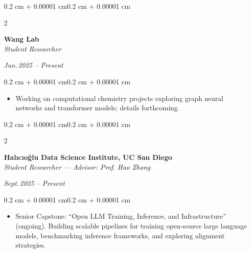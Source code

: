 \documentclass[10pt, letterpaper]{article}
\newenvironment{highlights}{
    \begin{itemize}[
        topsep=0.10 cm,
        parsep=0.10 cm,
        partopsep=0pt,
        itemsep=0pt,
        leftmargin=0.4 cm + 10pt
    ]
}{\end{itemize}}
\newenvironment{onecolentry}{
    \begin{adjustwidth}{0.2 cm + 0.00001 cm}{0.2 cm + 0.00001 cm}
}{\end{adjustwidth}}
\newenvironment{twocolentry}[2][]{
    \onecolentry
    \def\secondColumn{#2}
    \setcolumnwidth{\fill, 4.5 cm}
    \begin{paracol}{2}
}{
    \switchcolumn \raggedleft \secondColumn
    \end{paracol}
    \endonecolentry
}
\begin{document}
    \vspace{0.20 cm}

    \begin{twocolentry}{\textit{Jun.\,2025 -- Present}}
        \textbf{Wang Lab}\\
        \textit{Student Researcher}
    \end{twocolentry}

    \vspace{0.10 cm}
    \begin{onecolentry}
        \begin{highlights}
            \item Working on computational chemistry projects exploring graph neural networks and transformer models; details forthcoming.
        \end{highlights}
    \end{onecolentry}

    \vspace{0.20 cm}

    \begin{twocolentry}{\textit{Sept.\,2025 -- Present}}
        \textbf{Halıcıo\u{g}lu Data Science Institute, UC San Diego}\\
        \textit{Student Researcher — Advisor: Prof. Hao Zhang}
    \end{twocolentry}

    \vspace{0.10 cm}
    \begin{onecolentry}
        \begin{highlights}
            \item Senior Capstone: “Open LLM Training, Inference, and Infrastructure” (ongoing). Building scalable pipelines for training open‑source large language models, benchmarking inference frameworks, and exploring alignment strategies.
        \end{highlights}
    \end{onecolentry}

    \vspace{0.20 cm}

\end{document}
